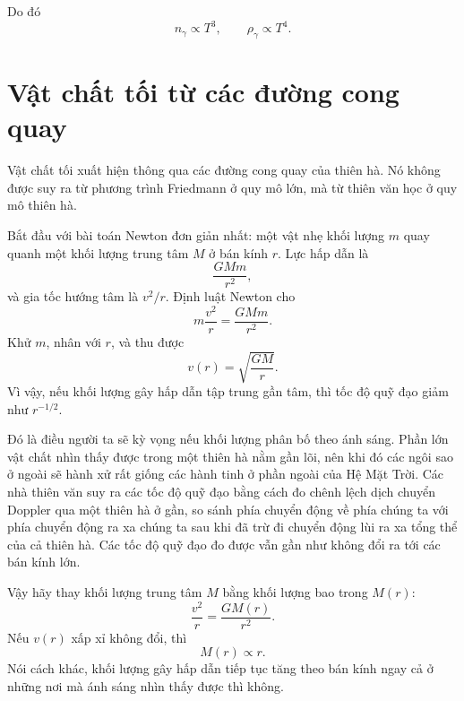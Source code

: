 Do đó
\begin{equation}
n_\gamma\propto T^3,
\qquad
\rho_\gamma\propto T^4.
\end{equation}

\section{Vật chất tối từ các đường cong quay}

Vật chất tối xuất hiện thông qua các đường cong quay của thiên hà. Nó không được suy ra từ phương trình Friedmann ở quy mô lớn, mà từ thiên văn học ở quy mô thiên hà.

Bắt đầu với bài toán Newton đơn giản nhất: một vật nhẹ khối lượng \(m\) quay quanh một khối lượng trung tâm \(M\) ở bán kính \(r\). Lực hấp dẫn là
\begin{equation}
\frac{GMm}{r^2},
\end{equation}
và gia tốc hướng tâm là \(v^2/r\). Định luật Newton cho
\begin{equation}
m\frac{v^2}{r}=\frac{GMm}{r^2}.
\end{equation}
Khử \(m\), nhân với \(r\), và thu được
\begin{equation}
v(r)=\sqrt{\frac{GM}{r}}.
\end{equation}
Vì vậy, nếu khối lượng gây hấp dẫn tập trung gần tâm, thì tốc độ quỹ đạo giảm như \(r^{-1/2}\).

Đó là điều người ta sẽ kỳ vọng nếu khối lượng phân bố theo ánh sáng. Phần lớn vật chất nhìn thấy được trong một thiên hà nằm gần lõi, nên khi đó các ngôi sao ở ngoài sẽ hành xử rất giống các hành tinh ở phần ngoài của Hệ Mặt Trời. Các nhà thiên văn suy ra các tốc độ quỹ đạo bằng cách đo chênh lệch dịch chuyển Doppler qua một thiên hà ở gần, so sánh phía chuyển động về phía chúng ta với phía chuyển động ra xa chúng ta sau khi đã trừ đi chuyển động lùi ra xa tổng thể của cả thiên hà. Các tốc độ quỹ đạo đo được vẫn gần như không đổi ra tới các bán kính lớn.

Vậy hãy thay khối lượng trung tâm \(M\) bằng khối lượng bao trong \(M(r)\):
\begin{equation}
\frac{v^2}{r}=\frac{G M(r)}{r^2}.
\end{equation}
Nếu \(v(r)\) xấp xỉ không đổi, thì
\begin{equation}
M(r)\propto r.
\end{equation}
Nói cách khác, khối lượng gây hấp dẫn tiếp tục tăng theo bán kính ngay cả ở những nơi mà ánh sáng nhìn thấy được thì không.

